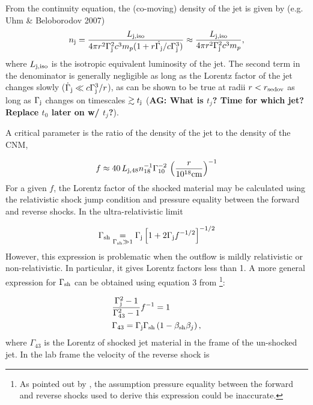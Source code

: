 \documentclass[usenatbib,fleqn]{mnras}
\begin{document}
From the continuity equation, the (co-moving) density of the jet is
given by (e.g. Uhm \& Beloborodov 2007)
 \begin{align}
   n_{\rm j} =  \frac{L_{\rm j, iso}}{4 \pi r^{2}\Gamma_{\rm
       j}^{2}c^{3}m_p(1 + r \dot{\Gamma_{\rm j}}/c\Gamma_{\rm j}^{3})}
   \approx  \frac{L_{\rm j, iso}}{4 \pi r^{2}\Gamma_{\rm j}^{2}c^{3}m_p},
\end{align}
%
where $L_{\rm j, iso}$ is the isotropic equivalent luminosity of the
jet. The second term in the denominator is generally negligible as
long as the Lorentz factor of the jet changes slowly
($\dot{\Gamma}_{\rm j} \ll c\Gamma_{\rm j}^{3}/r$), as can be shown to
be true at radii $r < r_{\rm sedov}$ as long as $\Gamma_{\rm j}$
changes on timescales $\gtrsim t_{\rm j}$ ({\bf AG: What is $t_j$?
  Time for which jet? Replace $t_0$ later on w/ $t_j$?}).

A critical parameter is the ratio of the density of the jet to the
density of the CNM,

\begin{equation}
  f\approx 40\,  L_{\rm j,48} n_{18}^{-1} \Gamma_{10}^{-2} \, \left(\frac{r}{10^{18} {\rm
        cm}}\right)^{-1} 
\end{equation}
%
For a given $f$, the Lorentz factor of the shocked material may be
calculated using the relativistic shock jump condition and pressure
equality between the forward and reverse shocks. In the
ultra-relativistic limit 

\begin{equation}
\Gamma_{\rm sh} \underset{\Gamma_{\rm sh} \gg 1}= \Gamma_{\rm j}\left[1 + 2\Gamma_{\rm j}f^{-1/2}\right]^{-1/2}
\end{equation}
%
However, this expression is problematic when the outflow is mildly
relativistic or non-relativistic. In particular, it gives Lorentz
factors less than 1. A more general expression for $\Gamma_{\rm sh}$
can be obtained using equation 3 from
\citet{Beloborodov&Uhm2006}\footnote{As pointed out by
  \citet{Beloborodov&Uhm2006}, the assumption pressure equality
  between the forward and reverse shocks used to derive this
  expression could be inaccurate.}:

\begin{align}
&\frac{\Gamma_{\rm j}^2-1}{\Gamma_{43}^2-1} f^{-1}=1\\
&\Gamma_{43}=\Gamma_{\rm j} \Gamma_{\rm sh} \left(1-\beta_{\rm sh} \beta_j\right),
\label{eq:gammaShGen}
\end{align}
%
where $\Gamma_{43}$ is the Lorentz of shocked jet material in the
frame of the un-shocked jet. In the lab frame the velocity of the
reverse shock is
\end{document}

